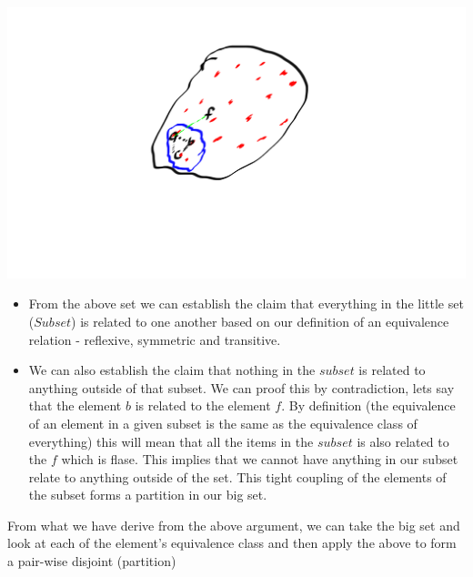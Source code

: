 \documentclass[12pt]{article}
\begin{document}
\begin{enumerate}
\begin{enumerate}
    \begin{center}
    \includegraphics[scale=0.24]{num2.png}
    \end{center}
    \begin{itemize}
            \item From the above set we can establish the claim that everything in the little set ($Subset$)  is related to one another based on our definition of an equivalence relation - reflexive, symmetric and transitive.
                \item We can also establish the claim that nothing in the $subset$ is related to anything outside of that subset. We can proof this by contradiction, lets say that the element $b$ is related to the element $f$. By definition (the equivalence of an element in a given subset is the same as the equivalence class of everything) this will mean that all the items in the $subset$ is also related to the $f$ which is flase. This implies that we cannot have anything in our subset relate to anything outside of the set. This tight coupling of the elements of the subset forms a partition in our big set. 
    \end{itemize}
    From what we have derive from the above argument, we can take the big set and look at each of the element's equivalence class  and then apply the above to form a pair-wise disjoint (partition)
    \end{enumerate}


\end{enumerate}
\end{document}
